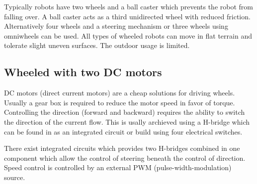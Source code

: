 Typically robots have two wheels and a ball caster which prevents the robot from falling over. A ball caster acts as a third unidirected wheel with reduced friction. Alternatively four wheels and a steering mechanism or three wheels using omniwheels can be used. All types of wheeled robots can move in flat terrain and tolerate slight uneven surfaces. The outdoor usage is limited.
\subsection{Wheeled with two DC motors}
DC motors (direct current motors) are a cheap solutions for driving wheels. Usually a gear box is required to reduce the motor speed in favor of torque. Controlling the direction (forward and backward) requires the ability to switch the direction of the current flow. This is usally archieved using a H-bridge which can be found in as an integrated circuit or build using four electrical switches. 

There exist integrated circuits which provides two H-bridges combined in one component which allow the control of steering beneath the control of direction. Speed control is controlled by an external PWM (pulse-width-modulation) source.\cite[pp. 279]{niku2001introduction}

